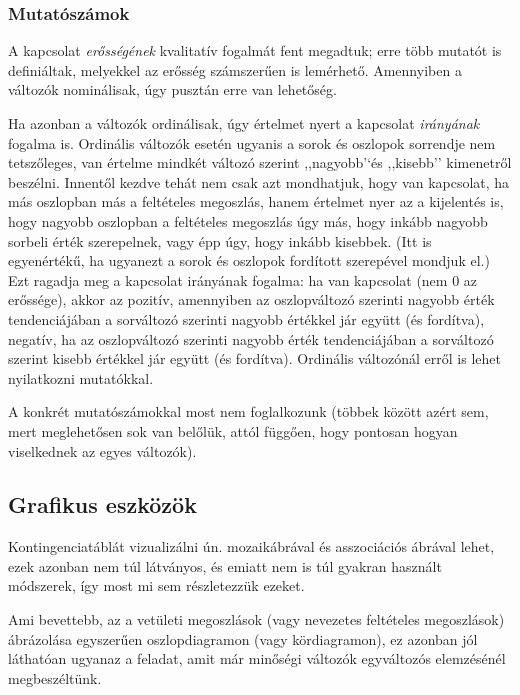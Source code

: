 \documentclass[]{book}
\begin{document}
\subsubsection{Mutatószámok}\label{deskriptivminketvaltanalitikusmutatoszamok}

A kapcsolat \emph{erősségének} kvalitatív fogalmát fent megadtuk; erre
több mutatót is definiáltak, melyekkel az erősség számszerűen is
lemérhető. Amennyiben a változók nominálisak, úgy pusztán erre van
lehetőség.

Ha azonban a változók ordinálisak, úgy értelmet nyert a kapcsolat
\emph{irányának} fogalma is. Ordinális változók esetén ugyanis a sorok
és oszlopok sorrendje nem tetszőleges, van értelme mindkét változó
szerint ,,nagyobb'`és ,,kisebb'' kimenetről beszélni. Innentől kezdve
tehát nem csak azt mondhatjuk, hogy van kapcsolat, ha más oszlopban más
a feltételes megoszlás, hanem értelmet nyer az a kijelentés is, hogy
nagyobb oszlopban a feltételes megoszlás úgy más, hogy inkább nagyobb
sorbeli érték szerepelnek, vagy épp úgy, hogy inkább kisebbek. (Itt is
egyenértékű, ha ugyanezt a sorok és oszlopok fordított szerepével
mondjuk el.) Ezt ragadja meg a kapcsolat irányának fogalma: ha van
kapcsolat (nem 0 az erőssége), akkor az pozitív, amennyiben az
oszlopváltozó szerinti nagyobb érték tendenciájában a sorváltozó
szerinti nagyobb értékkel jár együtt (és fordítva), negatív, ha az
oszlopváltozó szerinti nagyobb érték tendenciájában a sorváltozó szerint
kisebb értékkel jár együtt (és fordítva). Ordinális változónál erről is
lehet nyilatkozni mutatókkal.

A konkrét mutatószámokkal most nem foglalkozunk (többek között azért
sem, mert meglehetősen sok van belőlük, attól függően, hogy pontosan
hogyan viselkednek az egyes változók).

\subsection{Grafikus eszközök}\label{deskriptivminketvaltgrafikus}

Kontingenciatáblát vizualizálni ún. mozaikábrával és asszociációs
ábrával lehet, ezek azonban nem túl látványos, és emiatt nem is túl
gyakran használt módszerek, így most mi sem részletezzük ezeket.

Ami bevettebb, az a vetületi megoszlások (vagy nevezetes feltételes
megoszlások) ábrázolása egyszerűen oszlopdiagramon (vagy kördiagramon),
ez azonban jól láthatóan ugyanaz a feladat, amit már minőségi változók
egyváltozós elemzésénél megbeszéltünk.
\end{document}
